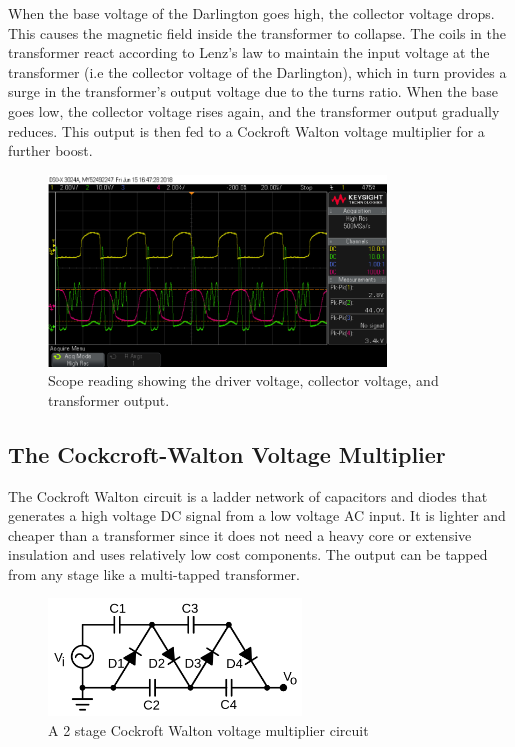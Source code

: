 \documentclass[11pt]{article}
\begin{document}
When the base voltage of the Darlington goes high, the collector voltage drops. This causes the magnetic field inside the transformer to collapse. The coils in the transformer react according to Lenz's law to maintain the input voltage at the transformer (i.e the collector voltage of the Darlington), which in turn provides a surge in the transformer's output voltage due to the turns ratio. When the base goes low, the collector voltage rises again, and the transformer output gradually reduces. This output is then fed to a Cockroft Walton voltage multiplier for a further boost.

\begin{figure}[h!]
\centering
\includegraphics[width = 0.8\textwidth]{thruster_sc_1}
\caption{\label{fig:transformer_out} Scope reading showing the driver voltage, collector voltage, and transformer output.}
\end{figure}

\pagebreak
\subsection{The Cockcroft-Walton Voltage Multiplier}

The Cockroft Walton circuit is a ladder network of capacitors and diodes that generates a high voltage DC signal from a low voltage AC input. It is lighter and cheaper than a transformer since it does not need a heavy core or extensive insulation and uses relatively low cost components. The output can be tapped from any stage like a multi-tapped transformer.\\

\begin{figure}[h!]
\centering
\includegraphics[width= 0.6\textwidth]{cockroft}
\caption{\label{fig:cockroft} A 2 stage Cockroft Walton voltage multiplier circuit}
\end{figure}
\end{document}
